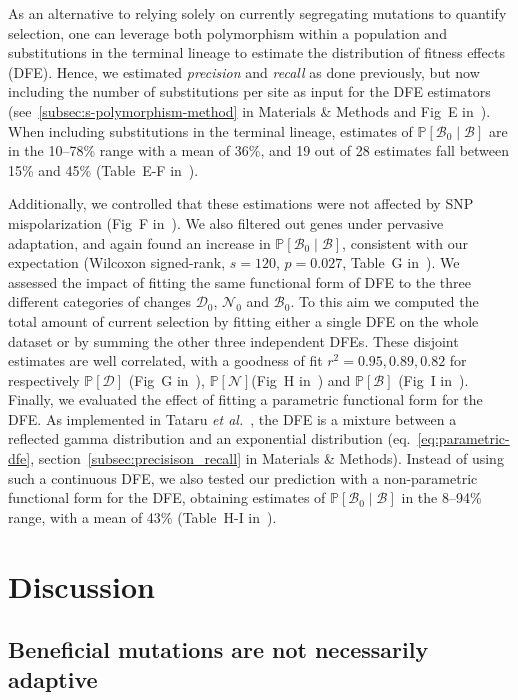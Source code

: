 \documentclass[10pt,letterpaper]{article}
\newcommand{\proba}{\mathbb{P}}
\newcommand{\SphyDel}{\mathcal{D}_0}
\newcommand{\SphyNeu}{\mathcal{N}_0}
\newcommand{\SphyBen}{\mathcal{B}_0}
\newcommand{\given}{\mid}
\newcommand{\SpopDel}{\mathcal{D}}
\newcommand{\SpopNeu}{\mathcal{N}}
\newcommand{\SpopBen}{\mathcal{B}}
\begin{document}
As an alternative to relying solely on currently segregating mutations to quantify selection, one can leverage both polymorphism within a population and substitutions in the terminal lineage to estimate the distribution of fitness effects (DFE).
Hence, we estimated \textit{precision} and \textit{recall} as done previously, but now including the number of substitutions per site as input for the DFE estimators (see~\ref{subsec:s-polymorphism-method} in Materials \& Methods and Fig~E in~).
When including substitutions in the terminal lineage, estimates of $\proba [ \SphyBen \given \SpopBen]$ are in the 10--78\% range with a mean of 36\%, and 19 out of 28 estimates fall between 15\% and 45\% (Table~E-F in~).

Additionally, we controlled that these estimations were not affected by SNP mispolarization (Fig~F in~).
We also filtered out genes under pervasive adaptation, and again found an increase in $\proba [ \SphyBen \given \SpopBen]$, consistent with our expectation (Wilcoxon signed-rank, $s=120$, $p=0.027$, Table~G in~).
We assessed the impact of fitting the same functional form of DFE to the three different categories of changes $\SphyDel$, $\SphyNeu$ and $\SphyBen$.
To this aim we computed the total amount of current selection by fitting either a single DFE on the whole dataset or by summing the other three independent DFEs.
These disjoint estimates are well correlated, with a goodness of fit $r^2={0.95, 0.89, 0.82}$ for respectively $\proba [\SpopDel]$ (Fig~G in~), $\proba [\SpopNeu]$(Fig~H in~) and $\proba [\SpopBen]$ (Fig~I in~).
Finally, we evaluated the effect of fitting a parametric functional form for the DFE.
As implemented in Tataru \textit{et al.}~\cite{tataru_inference_2017}, the DFE is a mixture between a reflected gamma distribution and an exponential distribution (eq.~\ref{eq:parametric-dfe}, section~\ref{subsec:precisison_recall} in Materials \& Methods).
Instead of using such a continuous DFE, we also tested our prediction with a non-parametric functional form for the DFE, obtaining estimates of $\proba [ \SphyBen \given \SpopBen]$ in the 8--94\% range, with a mean of 43\% (Table~H-I in~).

\section*{Discussion}
\subsection*{Beneficial mutations are not necessarily adaptive}
\end{document}
